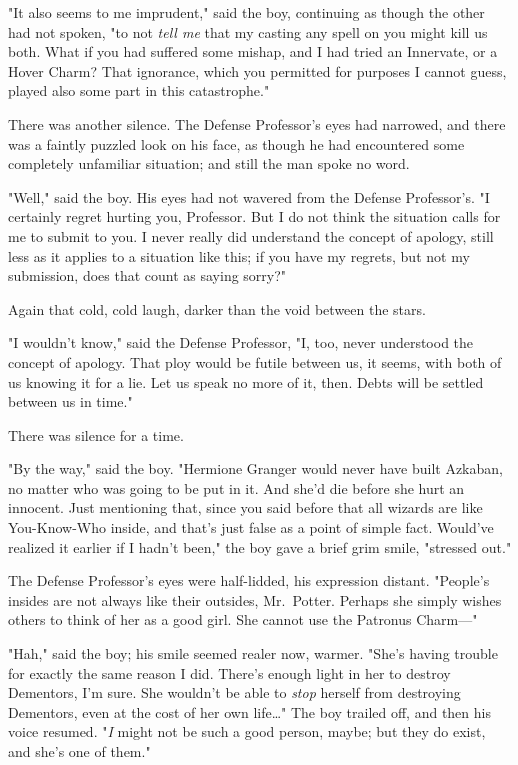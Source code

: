 "It also seems to me imprudent," said the boy, continuing as though the other 
had not spoken, "to not \emph{tell me} that my casting any spell on you might 
kill us both. What if you had suffered some mishap, and I had tried an 
Innervate, or a Hover Charm? That ignorance, which you permitted for purposes I 
cannot guess, played also some part in this catastrophe."

There was another silence. The Defense Professor's eyes had narrowed, and there 
was a faintly puzzled look on his face, as though he had encountered some 
completely unfamiliar situation; and still the man spoke no word.

"Well," said the boy. His eyes had not wavered from the Defense Professor's. "I 
certainly regret hurting you, Professor. But I do not think the situation calls 
for me to submit to you. I never really did understand the concept of apology, 
still less as it applies to a situation like this; if you have my regrets, but 
not my submission, does that count as saying sorry?"

Again that cold, cold laugh, darker than the void between the stars.

"I wouldn't know," said the Defense Professor, "I, too, never understood the 
concept of apology. That ploy would be futile between us, it seems, with both 
of us knowing it for a lie. Let us speak no more of it, then. Debts will be 
settled between us in time."

There was silence for a time.

"By the way," said the boy. "Hermione Granger would never have built Azkaban, 
no matter who was going to be put in it. And she'd die before she hurt an 
innocent. Just mentioning that, since you said before that all wizards are like 
You-Know-Who inside, and that's just false as a point of simple fact. Would've 
realized it earlier if I hadn't been," the boy gave a brief grim smile, 
"stressed out."

The Defense Professor's eyes were half-lidded, his expression distant. 
"People's insides are not always like their outsides, Mr.~Potter. Perhaps she 
simply wishes others to think of her as a good girl. She cannot use the 
Patronus Charm---"

"Hah," said the boy; his smile seemed realer now, warmer. "She's having trouble 
for exactly the same reason I did. There's enough light in her to destroy 
Dementors, I'm sure. She wouldn't be able to \emph{stop} herself from 
destroying Dementors, even at the cost of her own life{\ldots}" The boy trailed 
off, and then his voice resumed. "\emph{I} might not be such a good person, 
maybe; but they do exist, and she's one of them."

